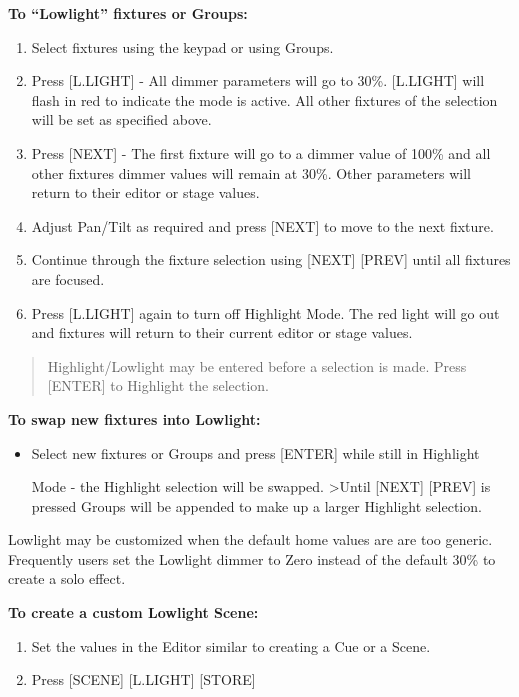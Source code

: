 \documentclass[
]{article}
\providecommand{\tightlist}{%
  \setlength{\itemsep}{0pt}\setlength{\parskip}{0pt}}
\begin{document}
\textbf{To ``Lowlight'' fixtures or Groups:}

\begin{enumerate}
\def\labelenumi{\arabic{enumi}.}
\item
  Select fixtures using the keypad or using Groups.
\item
  {Press {[}L.LIGHT{]} - All dimmer parameters will go to 30\%. {[}L.LIGHT{]} will flash in red to indicate the mode is active. All other fixtures of the selection will be set as specified above.}
\item
  Press {[}NEXT{]} - The first fixture will go to a dimmer value of 100\% and all other fixtures dimmer values will remain at 30\%. Other parameters will return to their editor or stage values.
\item
  Adjust Pan/Tilt as required and press {[}NEXT{]} to move to the next fixture.
\item
  Continue through the fixture selection using {[}NEXT{]} {[}PREV{]} until all fixtures are focused.
\item
  Press {[}L.LIGHT{]} again to turn off Highlight Mode. The red light will go out and fixtures will return to their current editor or stage values.
\end{enumerate}

\begin{quote}
Highlight/Lowlight may be entered before a selection is made.
Press {[}ENTER{]} to Highlight the selection.
\end{quote}

\textbf{To swap new fixtures into Lowlight:}

\begin{itemize}
\item
  Select new fixtures or Groups and press {[}ENTER{]} while still in Highlight

  Mode - the Highlight selection will be swapped.
  \textgreater Until {[}NEXT{]} {[}PREV{]} is pressed Groups will be appended to make up a larger Highlight selection.
\end{itemize}

Lowlight may be customized when the default home values are are too generic. Frequently users set the Lowlight dimmer to Zero instead of the default 30\% to create a solo effect.

\textbf{To create a custom Lowlight Scene:}

\begin{enumerate}
\def\labelenumi{\arabic{enumi}.}
\tightlist
\item
  Set the values in the Editor similar to creating a Cue or a Scene.
\item
  Press {[}SCENE{]} {[}L.LIGHT{]} {[}STORE{]}
\end{enumerate}
\end{document}

